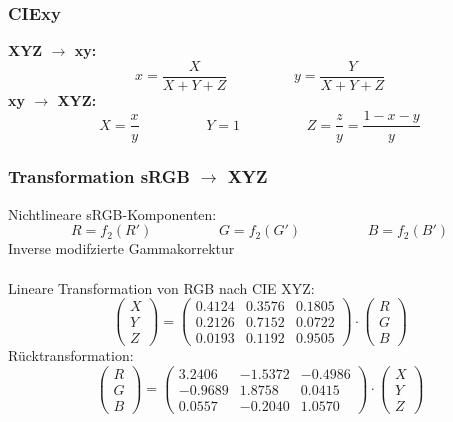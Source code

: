 \documentclass[10pt]{article}
\begin{document}
\subsubsection{CIExy}
\textbf{XYZ $\rightarrow$ xy:}
\begin{equation*}
	x= \frac{X}{X+Y+Z} \hspace{2cm} y= \frac{Y}{X+Y+Z}
\end{equation*}
\textbf{xy $\rightarrow$ XYZ:}
\begin{equation*}
	X=\frac{x}{y}\hspace{2cm} Y=1 \hspace{2cm} Z = \frac{z}{y} = \frac{1-x-y}{y}
\end{equation*}
\subsubsection{Transformation sRGB $\rightarrow$ XYZ}
Nichtlineare sRGB-Komponenten: 
\begin{equation*}
	R = f_2(R') \hspace{2cm} G = f_2(G') \hspace{2cm} B = f_2(B')
\end{equation*}
Inverse modifzierte Gammakorrektur \\
\\
Lineare Transformation von RGB nach CIE XYZ:
\begin{equation*}
	\begin{pmatrix} X \\ Y \\ Z \end{pmatrix} = \begin{pmatrix} 0.4124 & 0.3576 & 0.1805 \\0.2126 & 0.7152 & 0.0722 \\ 0.0193 & 0.1192 & 0.9505\end{pmatrix} \cdot \begin{pmatrix} R \\ G \\ B \end{pmatrix}
\end{equation*}
Rücktransformation:
\begin{equation*}
	\begin{pmatrix} R \\ G \\ B \end{pmatrix}= \begin{pmatrix} 3.2406 & -1.5372 & -0.4986 \\ -0.9689 & 1.8758 & 0.0415 \\ 0.0557 & -0.2040 & 1.0570 \end{pmatrix} \cdot \begin{pmatrix} X \\ Y \\ Z \end{pmatrix} 
\end{equation*}
\end{document}

